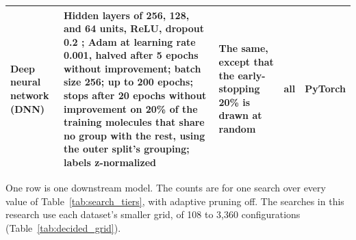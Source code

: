 {\begin{longtable}{@{}P{1.9cm}P{4.0cm}P{3.5cm}P{1.6cm}P{2.3cm}@{}}
\addlinespace
Deep neural network (DNN) & Hidden layers of 256, 128, and 64 units, ReLU, dropout 0.2 \citep{Srivastava2014}; Adam \citep{Kingma2015} at learning rate 0.001, halved after 5 epochs without improvement; batch size 256; up to 200 epochs; stops after 20 epochs without improvement on 20\% of the training molecules that share no group with the rest, using the outer split's grouping; labels z-normalized & The same, except that the early-stopping 20\% is drawn at random & all & PyTorch \citep{Paszke2019} \\
\bottomrule
\end{longtable}
}


\label{app:add:search_size}
One row is one downstream model. The counts are for one search over every value of Table~\ref{tab:search_tiers}, with adaptive pruning off. The searches in this research use each dataset's smaller grid, of 108 to 3{,}360 configurations (Table~\ref{tab:decided_grid}).

